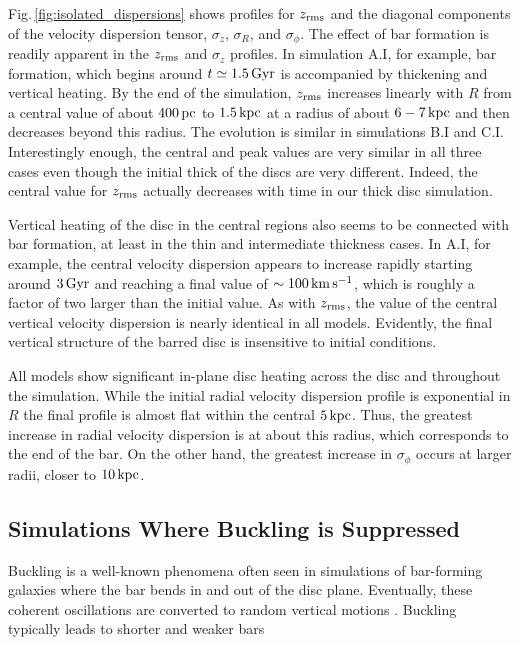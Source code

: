 Fig.\,\ref{fig:isolated_dispersions} shows profiles for $z_{\rm rms}$ and the
diagonal components of the velocity dispersion tensor, $\sigma_z$,
$\sigma_R$, and $\sigma_\phi$.  The effect of bar formation is readily
apparent in the $z_{\rm rms}$ and $\sigma_z$ profiles.  In simulation A.I,
for example, bar formation, which begins around $t\simeq 1.5\,{\rm
  Gyr}$ is accompanied by thickening and vertical heating.  By the end
of the simulation, $z_{\rm rms}$ increases linearly with $R$ from a
central value of about $400\,{\rm pc}$ to $1.5\,{\rm kpc}$ at a radius
of about $6-7\,{\rm kpc}$ and then decreases beyond this radius.  The
evolution is similar in simulations B.I and C.I.  Interestingly
enough, the central and peak values are very similar in all three
cases even though the initial thick of the discs are very different.
Indeed, the central value for $z_{\rm rms}$ actually decreases with time
in our thick disc simulation.  

Vertical heating of the disc in the central regions also seems to be
connected with bar formation, at least in the thin and intermediate
thickness cases.  In A.I, for example, the central velocity dispersion
appears to increase rapidly starting around $3\,{\rm Gyr}$ and
reaching a final value of $\sim 100\,{\rm km\,s^{-1}}$, which is
roughly a factor of two larger than the initial value.  As with
$z_{\rm rms}$, the value of the central vertical velocity dispersion is
nearly identical in all models.  Evidently, the final vertical
structure of the barred disc is insensitive to initial conditions.

All models show significant in-plane disc heating across the disc and
throughout the simulation.  While the initial radial velocity
dispersion profile is exponential in $R$ the final profile is almost
flat within the central $5\,{\rm kpc}$.  Thus, the greatest increase
in radial velocity dispersion is at about this radius, which
corresponds to the end of the bar.  On the other hand, the greatest
increase in $\sigma_\phi$ occurs at larger radii, closer to $10\,{\rm
  kpc}$.

\subsection{Simulations Where Buckling is Suppressed}\label{sec:buckling}

Buckling is a well-known phenomena often seen in simulations of
bar-forming galaxies where the bar bends in and out of the disc plane.
Eventually, these coherent oscillations are converted to random
vertical motions \citep{BT}.  Buckling typically leads to shorter and
weaker bars \citep{VP2004}

